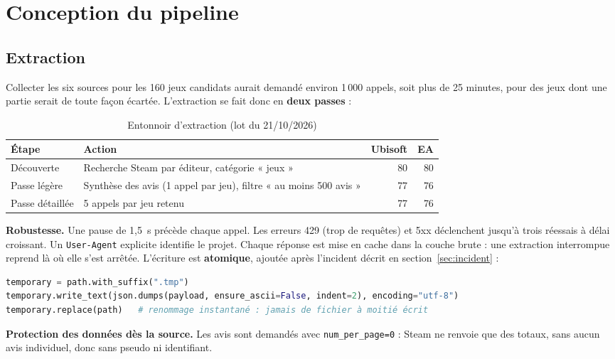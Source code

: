 \documentclass[11pt, a4paper, oneside, headings=normal, numbers=noenddot, DIV=12]{scrartcl}
\begin{document}
\section{Conception du pipeline}

\subsection{Extraction}
Collecter les six sources pour les 160 jeux candidats aurait demandé environ 1\,000 appels, soit plus de 25 minutes,
pour des jeux dont une partie serait de toute façon écartée. L'extraction se fait donc en \textbf{deux passes} :

\begin{table}[H]
\centering\small
\begin{tabularx}{\linewidth}{@{}l Y r r@{}}
\toprule
\textbf{Étape} & \textbf{Action} & \textbf{Ubisoft} & \textbf{EA} \\
\midrule
Découverte & Recherche Steam par éditeur, catégorie « jeux » & 80 & 80 \\
Passe légère & Synthèse des avis (1 appel par jeu), filtre « au moins 500 avis » & 77 & 76 \\
Passe détaillée & 5 appels par jeu retenu & 77 & 76 \\
\bottomrule
\end{tabularx}
\caption{Entonnoir d'extraction (lot du 21/10/2026)}
\end{table}

\textbf{Robustesse.} Une pause de 1,5~s précède chaque appel. Les erreurs 429 (trop de requêtes) et 5xx déclenchent jusqu'à trois réessais
à délai croissant. Un \texttt{User-Agent} explicite identifie le projet. Chaque réponse est mise en cache dans la couche brute : une
extraction interrompue reprend là où elle s'est arrêtée. L'écriture est \textbf{atomique}, ajoutée après l'incident décrit en section~\ref{sec:incident} :

\begin{lstlisting}[language=Python]
temporary = path.with_suffix(".tmp")
temporary.write_text(json.dumps(payload, ensure_ascii=False, indent=2), encoding="utf-8")
temporary.replace(path)   # renommage instantané : jamais de fichier à moitié écrit
\end{lstlisting}

\textbf{Protection des données dès la source.} Les avis sont demandés avec \texttt{num\_per\_page=0} : Steam ne renvoie que des totaux,
sans aucun avis individuel, donc sans pseudo ni identifiant.
\end{document}
